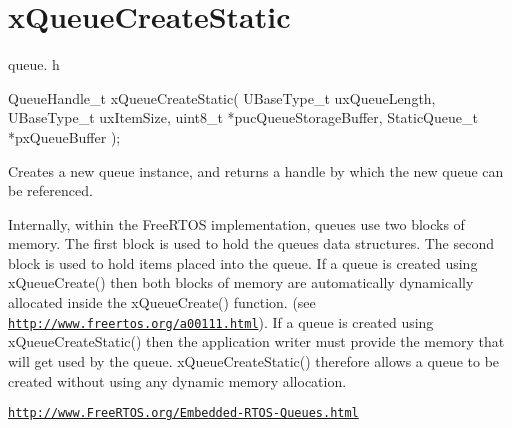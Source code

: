 \hypertarget{group__xQueueCreateStatic}{}\section{x\+Queue\+Create\+Static}
\label{group__xQueueCreateStatic}
queue. h 
\begin{DoxyPre}
QueueHandle\_t xQueueCreateStatic(
                          UBaseType\_t uxQueueLength,
                          UBaseType\_t uxItemSize,
                          uint8\_t *pucQueueStorageBuffer,
                          StaticQueue\_t *pxQueueBuffer
                      );
  \end{DoxyPre}


Creates a new queue instance, and returns a handle by which the new queue can be referenced.

Internally, within the Free\+R\+T\+OS implementation, queues use two blocks of memory. The first block is used to hold the queue\textquotesingle{}s data structures. The second block is used to hold items placed into the queue. If a queue is created using x\+Queue\+Create() then both blocks of memory are automatically dynamically allocated inside the x\+Queue\+Create() function. (see \href{http://www.freertos.org/a00111.html}{\tt http\+://www.\+freertos.\+org/a00111.\+html}). If a queue is created using x\+Queue\+Create\+Static() then the application writer must provide the memory that will get used by the queue. x\+Queue\+Create\+Static() therefore allows a queue to be created without using any dynamic memory allocation.

\href{http://www.FreeRTOS.org/Embedded-RTOS-Queues.html}{\tt http\+://www.\+Free\+R\+T\+O\+S.\+org/\+Embedded-\/\+R\+T\+O\+S-\/\+Queues.\+html}


